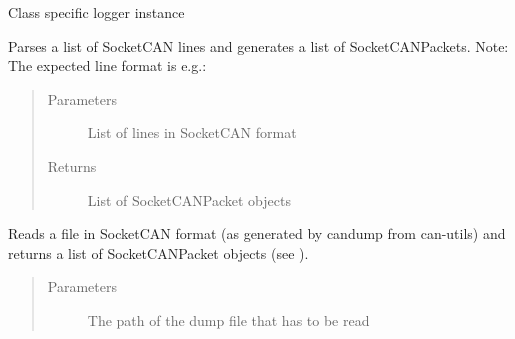 \documentclass[letterpaper,10pt,english]{sphinxmanual}
\begin{document}
\begin{fulllineitems}
\begin{fulllineitems}
\begin{quote}
\begin{description}
\begin{itemize}
\end{itemize}


\end{description}\end{quote}

\end{fulllineitems}


\begin{fulllineitems}
\label{\detokenize{src:src.CANData.CANData.logger}}
Class specific logger instance

\end{fulllineitems}


\begin{fulllineitems}
\label{\detokenize{src:src.CANData.CANData.parseSocketCANLines}}
Parses a list of SocketCAN lines  and generates a list of SocketCANPackets.
Note: The expected line format is e.g.:

\begin{quote}\begin{description}
\item[{Parameters}] \leavevmode
{} \textendash{} List of lines in SocketCAN format

\item[{Returns}] \leavevmode
List of SocketCANPacket objects

\end{description}\end{quote}

\end{fulllineitems}


\begin{fulllineitems}
\label{\detokenize{src:src.CANData.CANData.readCANFile}}
Reads a file in SocketCAN format (as generated by candump from can-utils)
and returns a list of SocketCANPacket objects (see {\hyperref[\detokenize{src:src.CANData.SocketCANPacket}]{}}).
\begin{quote}\begin{description}
\item[{Parameters}] \leavevmode
{} \textendash{} The path of the dump file that has to be read


\end{description}
\end{quote}
\end{fulllineitems}
\end{fulllineitems}
\end{document}
